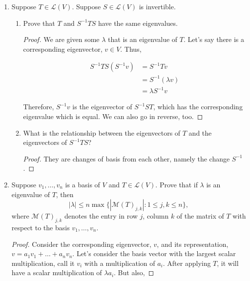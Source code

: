 \begin{enumerate}
\begin{proof}
        No real eigenvalues :(.
    \end{proof}

    \item[13] Suppose $T \in \mathcal{L}(V)$. Suppose $S \in \mathcal{L}(V)$ is invertible.
    \begin{enumerate}
        \item[(a)] Prove that $T$ and $S^{-1}TS$ have the same eigenvalues.

        \begin{proof}
            We are given some $\lambda$ that is an eigenvalue of $T$. Let's say there is a corresponding eigenvector, $v \in V$. Thus, 

            \begin{align*}
                S^{-1}TS(S^{-1}v) &= S^{-1}Tv \\
                &= S^{-1}(\lambda v) \\
                &= \lambda S^{-1} v
            \end{align*}

            Therefore, $S^{-1}v$ is the eigenvector of $S^{-1}ST$, which has the corresponding eigenvalue which is equal. We can also go in reverse, too.


        \end{proof}

        \item[(b)] What is the relationship between the eigenvectors of $T$ and the eigenvectors of $S^{-1}TS$?

        \begin{proof}
            They are changes of basis from each other, namely the change $S^{-1}$.
        \end{proof}
    \end{enumerate}

    \item[16] Suppose $v_1, \dots, v_n$ is a basis of $V$ and $T \in \mathcal{L}(V)$. Prove that if $\lambda$ is an eigenvalue of $T$, then
        \[
            |\lambda| \le n \max\{ |\mathcal{M}(T)_{j,k}| : 1 \le j,k \le n\},
        \]
        where $\mathcal{M}(T)_{j,k}$ denotes the entry in row $j$, column $k$ of the matrix of $T$ with respect to the basis $v_1, \dots, v_n$. 

    \begin{proof}
        Consider the corresponding eigenvector, $v$, and its representation, $v = a_1v_1 + \dots + a_nv_n$. Let's consider the basis vector with the largest scalar multiplication, call it $v_i$ with a multiplication of $a_i$. After applying $T$, it will have a scalar multiplication of $\lambda a_i$. But also, 


\end{proof}
\end{enumerate}
